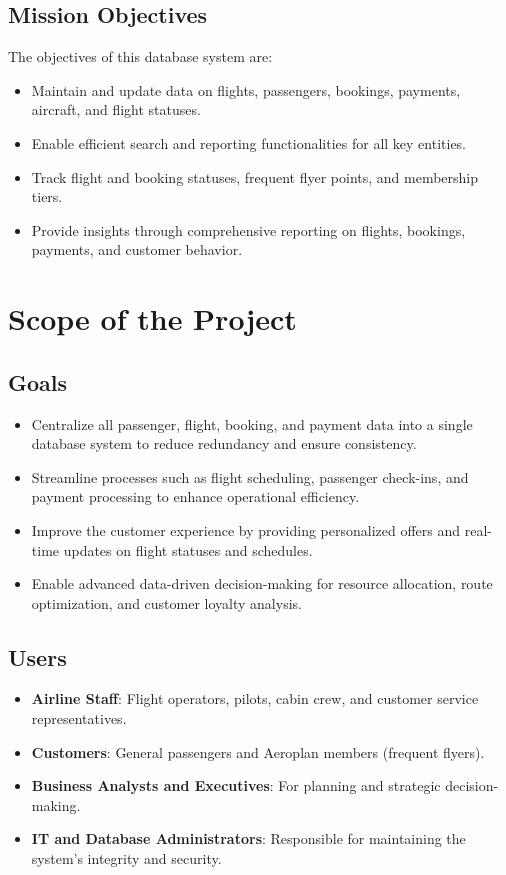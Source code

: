 \documentclass[12pt]{article}
\begin{document}
\subsection*{Mission Objectives}
The objectives of this database system are:
\begin{itemize}
    \item Maintain and update data on flights, passengers, bookings, payments, aircraft, and flight statuses.
    \item Enable efficient search and reporting functionalities for all key entities.
    \item Track flight and booking statuses, frequent flyer points, and membership tiers.
    \item Provide insights through comprehensive reporting on flights, bookings, payments, and customer behavior.
\end{itemize}

\section*{Scope of the Project}
\subsection*{Goals}
\begin{itemize}
    \item Centralize all passenger, flight, booking, and payment data into a single database system to reduce redundancy and ensure consistency.
    \item Streamline processes such as flight scheduling, passenger check-ins, and payment processing to enhance operational efficiency.
    \item Improve the customer experience by providing personalized offers and real-time updates on flight statuses and schedules.
    \item Enable advanced data-driven decision-making for resource allocation, route optimization, and customer loyalty analysis.
\end{itemize}

\subsection*{Users}
\begin{itemize}
    \item \textbf{Airline Staff}: Flight operators, pilots, cabin crew, and customer service representatives.
    \item \textbf{Customers}: General passengers and Aeroplan members (frequent flyers).
    \item \textbf{Business Analysts and Executives}: For planning and strategic decision-making.
    \item \textbf{IT and Database Administrators}: Responsible for maintaining the system's integrity and security.
\end{itemize}
\end{document}
